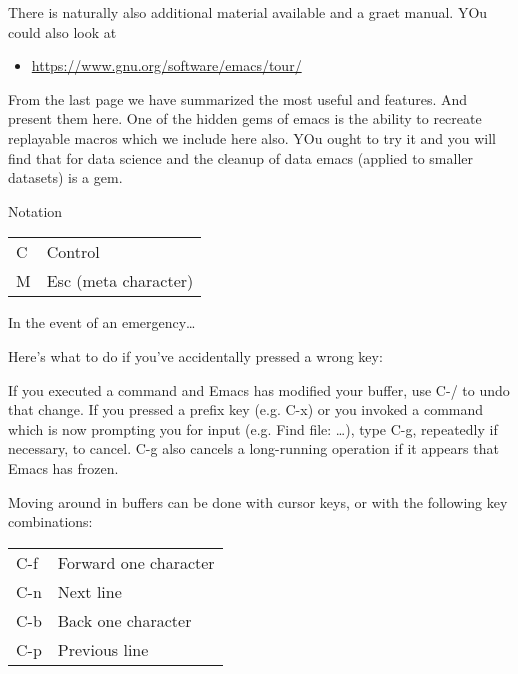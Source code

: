 There is naturally also additional material available and a graet
manual. YOu could also look at
\begin{itemize}
\item {} 
\url{https://www.gnu.org/software/emacs/tour/}

\end{itemize}

From the last page we have summarized the most useful and 
features. And present them here. One of the hidden gems of emacs is
the ability to recreate replayable macros which we include here also.
YOu ought to try it and you will find that for data science and the
cleanup of data emacs (applied to smaller datasets) is a gem.

Notation

\noindent\begin{tabulary}{\linewidth}{|L|L|}
\hline
{}\relax &\relax \\
\hline
C
&
Control
\\
\hline
M
&
Esc  (meta character)
\\
\hline\end{tabulary}


In the event of an emergency…

Here's what to do if you've accidentally pressed a wrong key:

If you executed a command and Emacs has modified your buffer, use C-/ to undo that change.
If you pressed a prefix key (e.g. C-x) or you invoked a command which is now prompting you for input (e.g. Find file: …), type C-g, repeatedly if necessary, to cancel.
C-g also cancels a long-running operation if it appears that Emacs has frozen.

Moving around in buffers can be done with cursor keys, or with the following key combinations:

\noindent\begin{tabulary}{\linewidth}{|L|L|}
\hline
{}\relax &\relax \\
\hline
C-f
&
Forward one character
\\
\hline
C-n
&
Next line
\\
\hline
C-b
&
Back one character
\\
\hline
C-p
&
Previous line
\\
\hline\end{tabulary}


